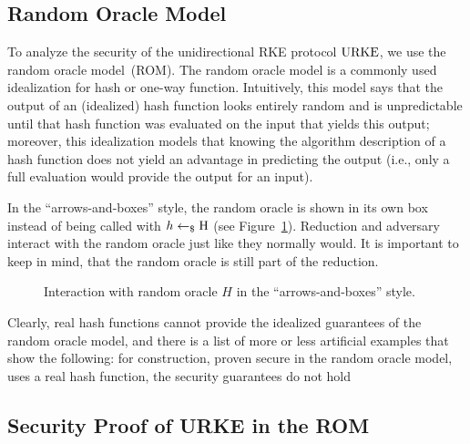 \subsection{Random Oracle Model}
To analyze the security of the unidirectional RKE protocol $\mathrm{URKE}$, we use the random oracle model~(ROM).
The random oracle model is a commonly used idealization for hash or one-way function.
Intuitively, this model says that the output of an (idealized) hash function looks entirely random and is unpredictable until that hash function was evaluated on the input that yields this output;
moreover, this idealization models that knowing the algorithm description of a hash function does not yield an advantage in predicting the output (i.e., only a full evaluation would provide the output for an input).

In the ``arrows-and-boxes'' style, the random oracle is shown in its own box instead of being called with $h\gets_\$ \mathrm{H}$ (see Figure~\ref{fig:rom:overview}).
Reduction and adversary interact with the random oracle just like they normally would.
It is important to keep in mind, that the random oracle is still part of the reduction.


\begin{figure}[!ht]
    \begin{minipage}[]{.5\textwidth}
        \centering
        \nicoresetlinenr%
        \fbox{%
            \scalebox{\codescalefactor}{%
            }%
        }
        \caption{%
            Simulation of a random oracle $H$.
        }
        \label{fig:rom:sim}
    \end{minipage}\hfill
    \begin{minipage}[]{.5\textwidth}
        \centering
        
        \caption{%
            Interaction with random oracle $H$ in the ``arrows-and-boxes'' style.
        }
        \label{fig:rom:overview}
    \end{minipage}
\end{figure}


Clearly, real hash functions cannot provide the idealized guarantees of the random oracle model, and there is a list of more or less artificial examples that show the following:
for  construction, proven secure in the random oracle model, uses a real hash function, the security guarantees do not hold

\subsection{Security Proof of URKE in the ROM}


